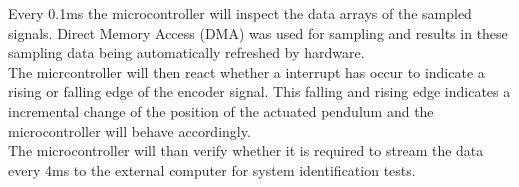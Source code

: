 Every 0.1ms the microcontroller will inspect the data arrays of the sampled signals. Direct Memory Access (DMA) was used for sampling and results in these sampling data being automatically refreshed by hardware.\\

The micrcontroller will then react whether a interrupt has occur to indicate a rising or falling edge of the encoder signal. This falling and rising edge indicates a incremental change of the position of the actuated pendulum and the microcontroller will behave accordingly.\\

The microcontroller will than verify whether it is required to stream the data every 4ms to the external computer for system identification tests.\\


